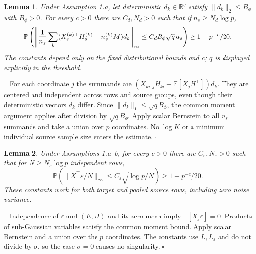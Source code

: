 \documentclass[12pt]{article}
\newtheorem{lemma}{Lemma}
\newenvironment{pf}{{\noindent \it Proof}\ }{\hfill $\square$\par}
\begin{document}
\begin{lemma}
\label{lem:weighted_confounding_transfer}
Under Assumption 1.a, let deterministic $d_k\in\mathbb R^q$ satisfy
$\|d_k\|_2\le B_\phi$ with $B_\phi>0$.
For every $c>0$ there are $C_d,N_d>0$ such that if
$n_s\ge N_d\log p$,
\[
 \mathbb P\left(\left\|{1\over n_s}\sum_k
 (X_s^{(k)\top}H_s^{(k)}-n_s^{(k)}M)d_k\right\|_\infty
       \le C_dB_\phi\sqrt q\,a_s\right)\ge1-p^{-c}/20.
\]
The constants depend only on the fixed distributional bounds and $c$;
$q$ is displayed explicitly in the threshold.
\end{lemma}
\begin{pf}
For each coordinate $j$ the summands are
$(X_{ki,j}H_{ki}^\top-\mathbb E[X_jH^\top])d_k$.
They are centered and independent across rows and source groups, even
though their deterministic vectors $d_k$ differ.
Since $\|d_k\|_1\le\sqrt q B_\phi$, the common moment argument applies
after division by $\sqrt q B_\phi$. Apply scalar Bernstein to all $n_s$
summands and take a union over $p$ coordinates. No $\log K$ or a minimum
individual source sample size enters the estimate.
\end{pf}

\begin{lemma}
\label{lem:error_noise}
Under Assumptions 1.a--b, for every $c>0$ there are
$C_\varepsilon,N_\varepsilon>0$ such that for
$N\ge N_\varepsilon\log p$ independent rows,
\[
 \mathbb P\left(\|X^\top\varepsilon/N\|_\infty
       \le C_\varepsilon\sqrt{\log p/N}\right)\ge1-p^{-c}/20.
\]
These constants work for both target and pooled source rows, including
zero noise variance.
\end{lemma}
\begin{pf}
Independence of $\varepsilon$ and $(E,H)$ and its zero mean imply
$\mathbb E[X_j\varepsilon]=0$. Products of sub-Gaussian variables satisfy
the common moment bound. Apply scalar Bernstein and a union over the $p$
coordinates. The constants use $L,L_\varepsilon$ and do not divide by
$\sigma$, so the case $\sigma=0$ causes no singularity.
\end{pf}
\end{document}
